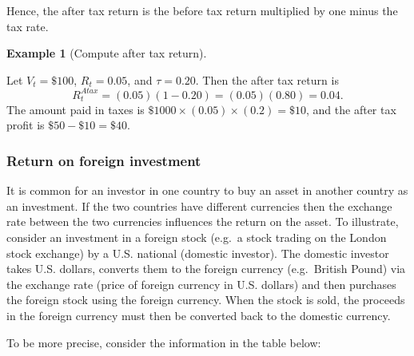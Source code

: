 \documentclass[
  letterpaper,
  DIV=11,
  numbers=noendperiod]{scrreprt}
\theoremstyle{definition}
\theoremstyle{definition}
\newtheorem{example}{Example}[chapter]
\theoremstyle{remark}
\begin{document}
Hence, the after tax return is the before tax return multiplied by one
minus the tax rate.

\begin{example}[Compute after tax
return]\protect\hypertarget{exm-example0110b}{}\label{exm-example0110b}

Let \(V_{t}=\$100\), \(R_{t}=0.05\), and \(\tau=0.20\). Then the after
tax return is \[R_{t}^{Atax} = (0.05)(1-0.20) = (0.05)(0.80) = 0.04.  \]
The amount paid in taxes is \(\$1000\times(0.05)\times(0.2)=\$10\), and
the after tax profit is \(\$50 - \$10 = \$40\).

\end{example}

\hypertarget{sec-return-on-foreign-investment}{%
\subsubsection{Return on foreign
investment}\label{sec-return-on-foreign-investment}}

 It is common for an investor in one
country to buy an asset in another country as an investment. If the two
countries have different currencies then the exchange rate between the
two currencies influences the return on the asset. To illustrate,
consider an investment in a foreign stock (e.g.~a stock trading on the
London stock exchange) by a U.S. national (domestic investor). The
domestic investor takes U.S. dollars, converts them to the foreign
currency (e.g.~British Pound) via the exchange rate (price of foreign
currency in U.S. dollars) and then purchases the foreign stock using the
foreign currency. When the stock is sold, the proceeds in the foreign
currency must then be converted back to the domestic currency.

To be more precise, consider the information in the table below:
\end{document}
